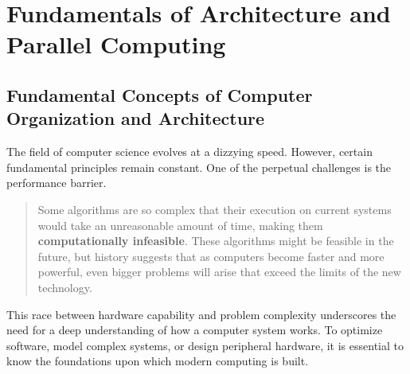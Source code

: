 \chapter{Fundamentals of Architecture and Parallel Computing}
\label{chap:fundamentos_arquitectura}

\section{Fundamental Concepts of Computer Organization and Architecture}
\label{sec:conceptos_fundamentales}

The field of computer science evolves at a dizzying speed. However, certain fundamental principles remain constant. One of the perpetual challenges is the performance barrier.

\begin{quote}
    Some algorithms are so complex that their execution on current systems would take an unreasonable amount of time, making them \textbf{computationally infeasible}. These algorithms might be feasible in the future, but history suggests that as computers become faster and more powerful, even bigger problems will arise that exceed the limits of the new technology.
\end{quote}

This race between hardware capability and problem complexity underscores the need for a deep understanding of how a computer system works. To optimize software, model complex systems, or design peripheral hardware, it is essential to know the foundations upon which modern computing is built.

